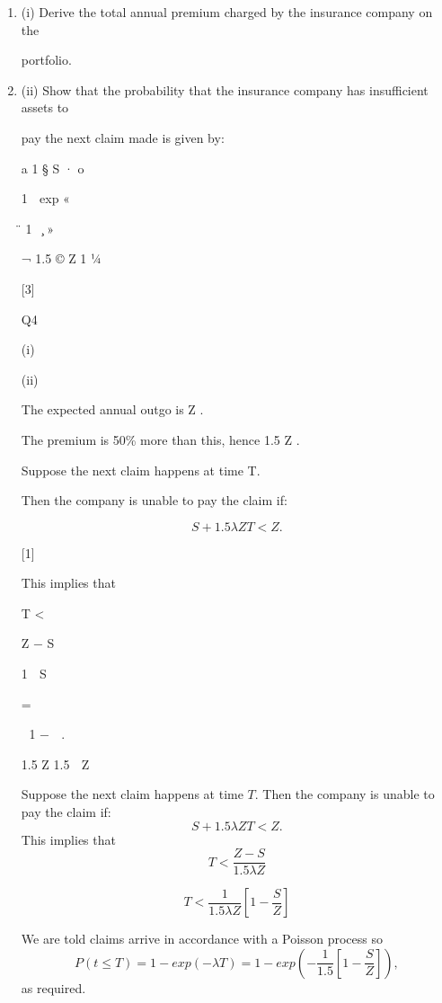 \documentclass[a4paper,12pt]{article}
\begin{document}
\begin{enumerate}
\item (i) Derive the total annual premium charged by the insurance company on the

portfolio.
\item  (ii) Show that the probability that the insurance company has insufficient assets to

pay the next claim made is given by:

a 1 § S · o

1  exp « 

 ̈ 1   ̧ »

¬ 1.5 © Z 1 1⁄4

[3]

\newpage

Q4

(i)

(ii)

The expected annual outgo is \lambda Z . 

The premium is 50\% more than this, hence 1.5 \lambda Z . 

Suppose the next claim happens at time T.

Then the company is unable to pay the claim if:

\[S + 1.5 \lambda ZT < Z .\]

[1]

This implies that

T <

Z − S

1  S 

=

 1 −  .

1.5 \lambda Z 1.5 \lambda  Z 



Suppose the next claim happens at time $T$.
Then the company is unable to pay the claim if:
\[S +1.5\lambda ZT < Z . \]
This implies that
\[ T < \frac{Z-S}{1.5\lambda Z}\]

\[ T < \frac{1}{1.5\lambda Z}\left[ 1- \frac{S}{Z}\right]\]

We are told claims arrive in accordance with a Poisson process so
\[P(t \leq T ) = 1- exp(-\lambda T )  
= 1 - exp \left( -\frac{1}{1.5} \left[ 1- \frac{S}{Z}\right] \right), \]
as required.






\end{enumerate}
\end{document}
